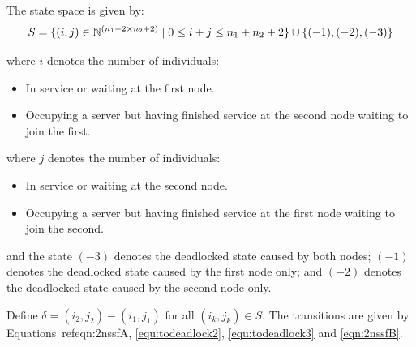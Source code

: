 \documentclass{article}
\numberwithin{equation}{section}
\begin{document}
The state space is given by:
    \[S = \{(i,j)\in\mathbb{N}^{(n_1+2\times n_2+2)} \nonscript\; | \nonscript\; 0 \leq i + j \leq n_1 + n_2 + 2
    \}\cup\{(-1), (-2), (-3)\}\]

    where \(i\) denotes the number of individuals:
        \begin{itemize}
            \item In service or waiting at the first node.
            \item Occupying a server but having finished service at the
                second node waiting to join the first.
        \end{itemize}
    where \(j\) denotes the number of individuals:
        \begin{itemize}
            \item In service or waiting at the second node.
            \item Occupying a server but having finished service at the
                first node waiting to join the second.
        \end{itemize}
    and the state $(-3)$ denotes the deadlocked state caused by both nodes; $(-1)$ denotes the deadlocked state caused by the first node only; and $(-2)$ denotes the deadlocked state caused by the second node only.

Define $\delta = (i_2, j_2) - (i_1, j_1)$ for all $(i_k, j_k) \in S$. The transitions are given by Equations~ref{eqn:2nssfA}, \ref{equ:todeadlock2}, \ref{equ:todeadlock3} and \ref{eqn:2nssfB}.
\end{document}
